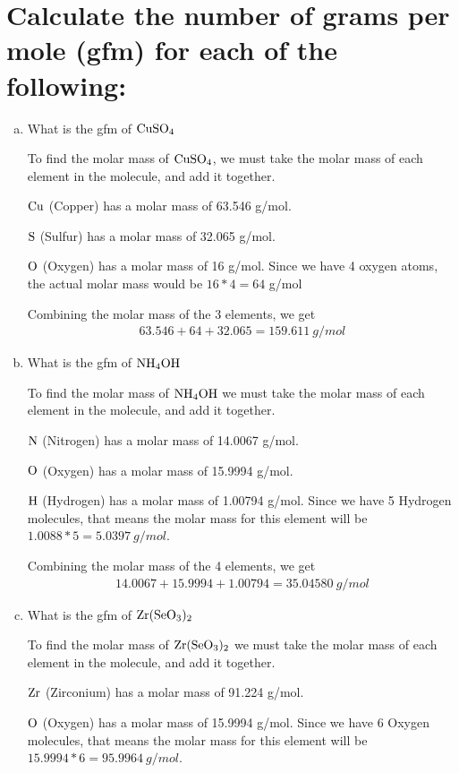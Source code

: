 \documentclass[11pt]{article}
\begin{document}
\section{Calculate the number of grams per mole (gfm) for each of the following:}
\label{sec:org3248e99}
\begin{enumerate}[(a)]
\item What is the gfm of \(\ce{CuSO4}\)

To find the molar mass of \(\ce{CuSO4}\), we must take the molar mass of
each element in the molecule, and add it together.

\(\ce{Cu}\) (Copper) has a molar mass of 63.546 g/mol.

\(\ce{S}\) (Sulfur) has a molar mass of 32.065 g/mol.

\(\ce{O}\) (Oxygen) has a molar mass of 16 g/mol. Since we have 4 oxygen
atoms, the actual molar mass would be \(16*4=64\) g/mol

Combining the molar mass of the 3 elements, we get
\begin{align*}
63.546+64+32.065=159.611\ g/mol
\end{align*}

\item What is the gfm of \(\ce{NH4OH}\)

To find the molar mass of \(\ce{NH4OH}\) we must take the molar mass of each element in the molecule, and add it together.

\(\ce{N}\) (Nitrogen) has a molar mass of 14.0067 g/mol.

\(\ce{O}\) (Oxygen) has a molar mass of 15.9994 g/mol.

\(\ce{H}\) (Hydrogen) has a molar mass of 1.00794 g/mol. Since we have 5
Hydrogen molecules, that means the molar mass for this element will be
\(1.0088*5=5.0397\ g/mol\).

Combining the molar mass of the 4 elements, we get
\begin{align*}
14.0067+15.9994+1.00794=35.04580\ g/mol
\end{align*}

\item What is the gfm of \(\ce{Zr(SeO3)2}\)

To find the molar mass of \(\ce{Zr(SeO3)2}\) we must take the molar mass of each element in the molecule, and add it together.

\(\ce{Zr}\) (Zirconium) has a molar mass of 91.224 g/mol.

\(\ce{O}\) (Oxygen) has a molar mass of 15.9994 g/mol. Since we have 6
Oxygen molecules, that means the molar mass for this element will be
\(15.9994*6=95.9964\ g/mol\).


\end{enumerate}
\end{document}
